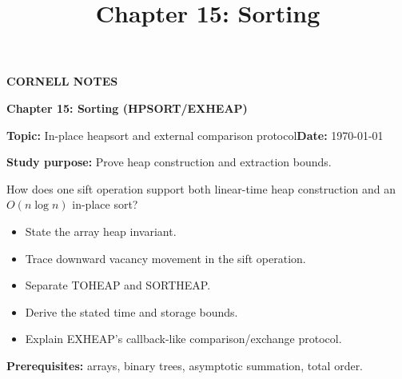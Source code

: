 \documentclass[10pt,letterpaper]{article}
\title{Chapter 15: Sorting}
\author{}
\date{}
\begin{document}
\maketitle
\begin{tcolorbox}[colback=Paper,colframe=Ink]{\small\bfseries\color{Teal}CORNELL NOTES}\par{\LARGE\bfseries Chapter 15: Sorting (HPSORT/EXHEAP)}\par\medskip\textbf{Topic:} In-place heapsort and external comparison protocol\hfill\textbf{Date:} \today\par\textbf{Study purpose:} Prove heap construction and extraction bounds.\end{tcolorbox}
\begin{tcolorbox}[colback=Teal!5,colframe=Teal,title=Essential question]How does one sift operation support both linear-time heap construction and an $O(n\log n)$ in-place sort?\end{tcolorbox}
\begin{tcolorbox}[colback=white,colframe=Mist,title=Learning objectives]\begin{itemize}\item State the array heap invariant.\item Trace downward vacancy movement in the sift operation.\item Separate TOHEAP and SORTHEAP.\item Derive the stated time and storage bounds.\item Explain EXHEAP's callback-like comparison/exchange protocol.\end{itemize}\textbf{Prerequisites:} arrays, binary trees, asymptotic summation, total order.\end{tcolorbox}
\end{document}
